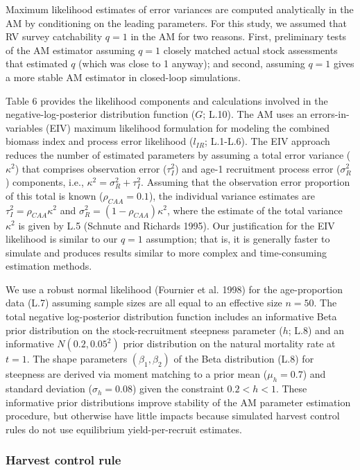 \documentclass[12pt,]{article}
\begin{document}
Maximum likelihood estimates of error variances are computed
analytically in the AM by conditioning on the leading parameters. For
this study, we assumed that RV survey catchability \(q = 1\) in the AM
for two reasons. First, preliminary tests of the AM estimator assuming
\(q = 1\) closely matched actual stock assessments that estimated \(q\)
(which was close to 1 anyway); and second, assuming \(q = 1\) gives a
more stable AM estimator in closed-loop simulations.

Table 6 provides the likelihood components and calculations involved in
the negative-log-posterior distribution function (\(G\); L.10). The AM
uses an errors-in-variables (EIV) maximum likelihood formulation for
modeling the combined biomass index and process error likelihood
(\(l_{IR}\); L.1-L.6). The EIV approach reduces the number of estimated
parameters by assuming a total error variance (\(\kappa^2\)) that
comprises observation error (\(\tau_I^2\)) and age-1 recruitment process
error (\(\sigma_R^2\)) components, i.e.,
\(\kappa^2 = \sigma_R^2 + \tau_I^2\). Assuming that the observation
error proportion of this total is known (\(\rho_{CAA} = 0.1\)), the
individual variance estimates are \(\tau_I^2 = \rho_{CAA}\kappa^2\) and
\(\sigma_R^2 = (1 - \rho_{CAA})\kappa^2\), where the estimate of the
total variance \(\kappa^2\) is given by L.5 (Schnute and Richards 1995).
Our justification for the EIV likelihood is similar to our \(q=1\)
assumption; that is, it is generally faster to simulate and produces
results similar to more complex and time-consuming estimation methods.

We use a robust normal likelihood (Fournier et al. 1998) for the
age-proportion data (L.7) assuming sample sizes are all equal to an
effective size \(n = 50\). The total negative log-posterior distribution
function includes an informative Beta prior distribution on the
stock-recruitment steepness parameter (\(h\); L.8) and an informative
\(N(0.2,0.05^2)\) prior distribution on the natural mortality rate at
\(t=1\). The shape parameters \((\beta_1,\beta_2)\) of the Beta
distribution (L.8) for steepness are derived via moment matching to a
prior mean (\(\mu_h = 0.7\)) and standard deviation
(\(\sigma_h = 0.08\)) given the constraint \(0.2 < h < 1\). These
informative prior distributions improve stability of the AM parameter
estimation procedure, but otherwise have little impacts because
simulated harvest control rules do not use equilibrium yield-per-recruit
estimates.

\subsubsection{Harvest control rule}\label{harvest-control-rule}
\end{document}
